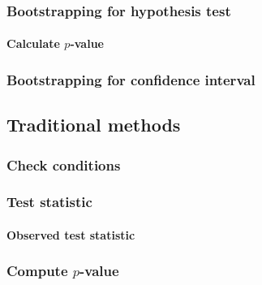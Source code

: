 \documentclass[
  12pt, krantz2,
]{krantz}
\begin{document}
\hypertarget{bootstrapping-for-hypothesis-test}{%
\subsubsection*{Bootstrapping for hypothesis test}\label{bootstrapping-for-hypothesis-test}}


\hypertarget{calculate-p-value}{%
\paragraph{\texorpdfstring{Calculate \(p\)-value}{Calculate p-value}}\label{calculate-p-value}}

\hypertarget{bootstrapping-for-confidence-interval}{%
\subsubsection*{Bootstrapping for confidence interval}\label{bootstrapping-for-confidence-interval}}


\hypertarget{traditional-methods}{%
\subsection{Traditional methods}\label{traditional-methods}}

\hypertarget{check-conditions}{%
\subsubsection*{Check conditions}\label{check-conditions}}


\hypertarget{test-statistic}{%
\subsubsection*{Test statistic}\label{test-statistic}}


\hypertarget{observed-test-statistic}{%
\paragraph{Observed test statistic}\label{observed-test-statistic}}

\hypertarget{compute-p-value}{%
\subsubsection*{\texorpdfstring{Compute \(p\)-value}{Compute p-value}}\label{compute-p-value}}
\end{document}
